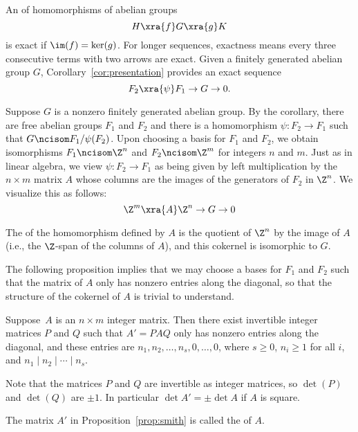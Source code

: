 An  of homomorphisms of abelian groups
$$
	H \xra{f} G \xra{g} K
$$
is exact if $\im(f) = \ker(g)$.
For longer sequences, exactness means every three consecutive
terms with two arrows are exact.
Given a finitely generated abelian group $G$,
Corollary~\ref{cor:presentation} provides an exact sequence
$$
	F_2 \xra{\psi} F_1 \to G \to 0.
$$

Suppose $G$ is a nonzero finitely generated abelian group.  By the
corollary, there are free abelian groups $F_1$ and $F_2$ and there is a
homomorphism $\psi:F_2 \to F_1$ such that $G\ncisom F_1/\psi(F_2)$.
Upon choosing a basis for $F_1$ and $F_2$, we obtain isomorphisms
$F_1\ncisom \Z^n$ and $F_2\ncisom \Z^m$ for integers $n$ and $m$.
Just as in linear algebra, we view $\psi:F_2\to F_1$ as being given
by left multiplication by the $n\times m$ matrix $A$ whose columns
are the images of the generators of $F_2$ in $\Z^n$.  We visualize
this as follows:
$$
	\Z^m \xra{A} \Z^n \to G \to 0
$$

The  of the homomorphism defined by $A$ is the quotient
of $\Z^n$ by the image of $A$ (i.e., the $\Z$-span of the columns of $A$),
and this cokernel is isomorphic to $G$.

The following proposition implies that we may choose a bases for $F_1$
and $F_2$ such that the matrix of $A$ only has nonzero entries along
the diagonal, so that the structure of the cokernel of $A$ is
trivial to understand.

\begin{proposition}
	\label{prop:smith}
	Suppose~$A$ is an $n\times m$ integer matrix.  Then there exist
	invertible integer matrices $P$ and $Q$ such that $A'=PAQ$ only
	has nonzero entries along the diagonal, and these entries are
	$n_1, n_2,\ldots, n_s,0,\ldots,0$, where
	$s\geq 0$, $n_i\geq 1$ for all $i$, and $n_1\mid n_2 \mid{} \cdots \mid{} n_s$.
\end{proposition}

\begin{remark}
	Note that the matrices $P$ and $Q$ are invertible as integer
	matrices, so $\det(P)$ and $\det(Q)$ are $\pm 1$. In particular
	$\det A' = \pm\det A$ if $A$ is square.
\end{remark}

\begin{definition}
	The matrix $A'$ in Proposition~\ref{prop:smith}
	is called the  of $A$.
\end{definition}

